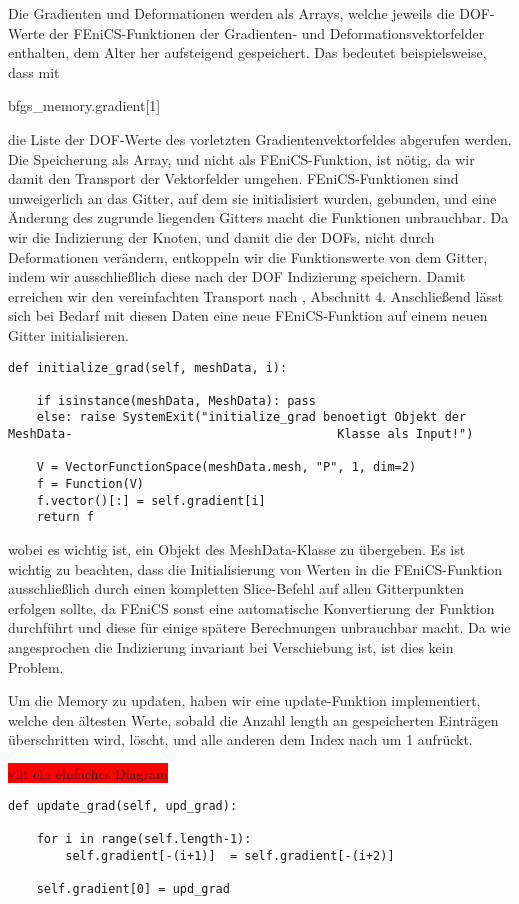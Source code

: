 \documentclass[bibliography=totoc,12pt,a4paper]{scrartcl}
\theoremstyle{exampstyle}
\numberwithin{equation}{section}
\begin{document}
Die Gradienten und Deformationen werden als Arrays, welche jeweils die DOF-Werte der FEniCS-Funktionen der Gradienten- und Deformationsvektorfelder enthalten, dem Alter her aufsteigend gespeichert. Das bedeutet beispielsweise, dass mit 
\begin{center}
	\textsf{bfgs\_memory.gradient[1]}
\end{center} 
die Liste der DOF-Werte des vorletzten Gradientenvektorfeldes abgerufen werden. Die Speicherung als Array, und nicht als FEniCS-Funktion, ist nötig, da wir damit den Transport der Vektorfelder umgehen. FEniCS-Funktionen sind unweigerlich an das Gitter, auf dem sie initialisiert wurden, gebunden, und eine Änderung des zugrunde liegenden Gitters macht die Funktionen unbrauchbar. Da wir die Indizierung der Knoten, und damit die der DOFs, nicht durch Deformationen verändern, entkoppeln wir die Funktionswerte von dem Gitter, indem wir ausschließlich diese nach der DOF Indizierung speichern. Damit erreichen wir den vereinfachten Transport nach \cite{diffusion}, Abschnitt 4. 
Anschließend  lässt sich bei Bedarf mit diesen Daten eine neue FEniCS-Funktion auf einem neuen Gitter initialisieren.
\begin{lstlisting}
def initialize_grad(self, meshData, i):

    if isinstance(meshData, MeshData): pass
    else: raise SystemExit("initialize_grad benoetigt Objekt der MeshData-			 						   Klasse als Input!")

    V = VectorFunctionSpace(meshData.mesh, "P", 1, dim=2)
    f = Function(V)
    f.vector()[:] = self.gradient[i]
    return f
\end{lstlisting}
wobei es wichtig ist, ein Objekt des \textsf{MeshData}-Klasse zu übergeben. Es ist wichtig zu beachten, dass die Initialisierung von Werten in die FEniCS-Funktion ausschließlich durch einen kompletten Slice-Befehl auf allen Gitterpunkten erfolgen sollte, da FEniCS sonst eine automatische Konvertierung der Funktion durchführt und diese für einige spätere Berechnungen unbrauchbar macht. Da wie angesprochen die Indizierung invariant bei Verschiebung ist, ist dies kein Problem.

Um die Memory zu updaten, haben wir eine update-Funktion implementiert, welche 
den ältesten Werte, sobald die Anzahl \textsf{length} an gespeicherten Einträgen überschritten wird, löscht, und alle anderen dem Index nach um 1 aufrückt. 

\colorbox{red}{ vllt ein einfaches Diagram}

\begin{lstlisting}
def update_grad(self, upd_grad):
    
    for i in range(self.length-1): 
      	self.gradient[-(i+1)]  = self.gradient[-(i+2)]
    
    self.gradient[0] = upd_grad
\end{lstlisting}
\end{document}
